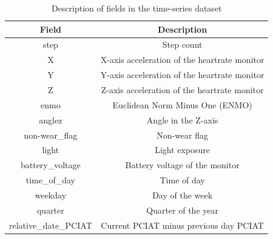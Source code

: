 \documentclass[11pt]{extarticle}
\begin{document}
\begin{table}[h!]
    \centering
    \begin{tabular}{|c|c|}
    \hline
    \textbf{Field} & \textbf{Description} \\
    \hline
    step & Step count \\
    X & X-axis acceleration of the heartrate monitor \\
    Y & Y-axis acceleration of the heartrate monitor \\
    Z & Z-axis acceleration of the heartrate monitor \\
    enmo & Euclidean Norm Minus One (ENMO) \\
    anglez & Angle in the Z-axis \\
    non-wear\_flag & Non-wear flag \\
    light & Light exposure \\
    battery\_voltage & Battery voltage of the monitor \\
    time\_of\_day & Time of day \\
    weekday & Day of the week \\
    quarter & Quarter of the year \\
    relative\_date\_PCIAT & Current PCIAT minus previous day PCIAT \\
    \hline
    \end{tabular}
    \caption{Description of fields in the time-series dataset}
    \label{table:fields}
    \end{table}
\end{document}
